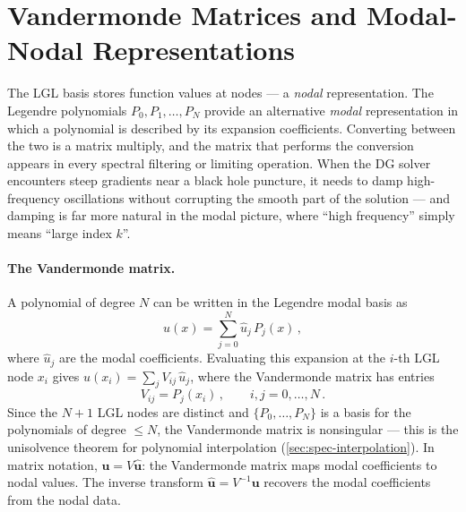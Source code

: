 \section{Vandermonde Matrices and Modal-Nodal Representations}
\label{sec:spec-vandermonde}

The LGL basis stores function values at nodes — a \emph{nodal}
representation.  The Legendre polynomials $P_0, P_1, \ldots, P_N$
provide an alternative \emph{modal} representation in which a
polynomial is described by its expansion coefficients.  Converting
between the two is a matrix multiply, and the matrix that performs
the conversion appears in every spectral filtering or limiting
operation.  When the DG solver encounters steep gradients near a
black hole puncture, it needs to damp high-frequency oscillations
without corrupting the smooth part of the solution — and damping is
far more natural in the modal picture, where ``high frequency'' simply
means ``large index $k$''.

\paragraph{The Vandermonde matrix.}

A polynomial of degree $N$ can be written in the Legendre modal basis
as
%
\begin{equation}
  u(x) = \sum_{j=0}^{N} \hat{u}_j\,P_j(x) \,,
  \label{eq:modal-expansion}
\end{equation}
%
where $\hat{u}_j$ are the modal coefficients.  Evaluating this
expansion at the $i$-th LGL node $x_i$ gives
$u(x_i) = \sum_j V_{ij}\,\hat{u}_j$, where the Vandermonde matrix
has entries
%
\begin{equation}
  V_{ij} = P_j(x_i) \,, \qquad
  i, j = 0, \ldots, N \,.
  \label{eq:vandermonde}
\end{equation}
%
Since the $N + 1$ LGL nodes are distinct and $\{P_0, \ldots, P_N\}$
is a basis for the polynomials of degree $\leq N$, the Vandermonde
matrix is nonsingular --- this is the unisolvence theorem for
polynomial interpolation (\cref{sec:spec-interpolation}).  In matrix
notation, $\mathbf{u} = V\hat{\mathbf{u}}$: the Vandermonde matrix
maps modal coefficients to nodal values.  The inverse transform
$\hat{\mathbf{u}} = V^{-1}\mathbf{u}$ recovers the modal
coefficients from the nodal data.

